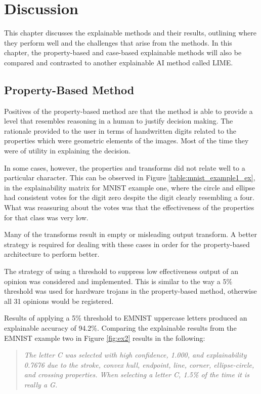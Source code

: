 \chapter{Discussion} \label{ch:discussion}

This chapter discusses the explainable methods and their results, outlining
where they perform well and the challenges that arise from the methods. In this
chapter, the property-based and case-based explainable methods will also be
compared and contrasted to another explainable AI method called LIME.

\section{Property-Based Method}

Positives of the property-based method are that the method is able to provide a
level that resembles reasoning in a human to justify decision making. The
rationale provided to the user in terms of handwritten digits related to the
properties which were geometric elements of the images.  Most of the time they
were of utility in explaining the decision.

In some cases, however, the properties and transforms did not relate well to a
particular character.  This can be observed in Figure
\ref{table:mnist_example1_ex}, in the explainability matrix for MNIST example
one, where the circle and ellipse had consistent votes for the digit zero
despite the digit clearly resembling a four.  What was reassuring about the
votes was that the effectiveness of the properties for that class was very low.

Many of the transforms result in empty or misleading output transform.  A better
strategy is required for dealing with these cases in order for the
property-based architecture to perform better.

The strategy of using a threshold to suppress low effectiveness output of an
opinion was considered and implemented.  This is similar to the way a $5\%$
threshold was used for hardware trojans in the property-based method, otherwise
all 31 opinions would be registered.

Results of applying a 5\% threshold to EMNIST uppercase letters produced
an explainable accuracy of 94.2\%. Comparing the explainable results from the EMNIST
example two in Figure \ref{fig:ex2} results in the  following:

\begin{quote}
\textit{The letter C was selected with high confidence, 1.000, and explainability 0.7676 due to the stroke, convex hull, endpoint, line, corner, ellipse-circle, and crossing properties. When selecting a letter C, 1.5\% of the time it is really a G.}
\end{quote}

